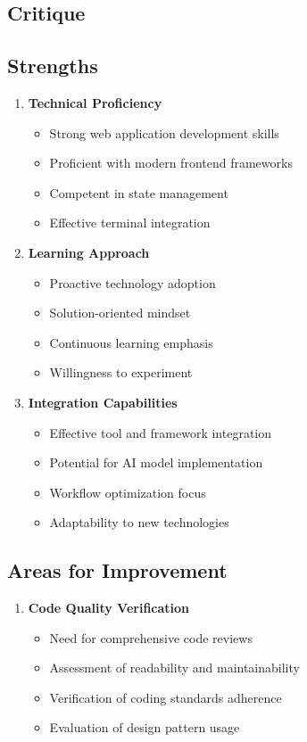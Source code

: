 \documentclass[10pt,a4paper]{article}
\begin{document}
\begin{multicols}{2}
\section*{Critique}

\subsection*{Strengths}
\begin{enumerate}\small
  \item \textbf{Technical Proficiency}
    \begin{itemize}
      \item Strong web application development skills
      \item Proficient with modern frontend frameworks
      \item Competent in state management
      \item Effective terminal integration
    \end{itemize}
  
  \item \textbf{Learning Approach}
    \begin{itemize}
      \item Proactive technology adoption
      \item Solution-oriented mindset
      \item Continuous learning emphasis
      \item Willingness to experiment
    \end{itemize}
  
  \item \textbf{Integration Capabilities}
    \begin{itemize}
      \item Effective tool and framework integration
      \item Potential for AI model implementation
      \item Workflow optimization focus
      \item Adaptability to new technologies
    \end{itemize}
\end{enumerate}

\subsection*{Areas for Improvement}
\begin{enumerate}\small
  \item \textbf{Code Quality Verification}
    \begin{itemize}
      \item Need for comprehensive code reviews
      \item Assessment of readability and maintainability
      \item Verification of coding standards adherence
      \item Evaluation of design pattern usage
    \end{itemize}
  

\end{enumerate}
\end{multicols}
\end{document}
